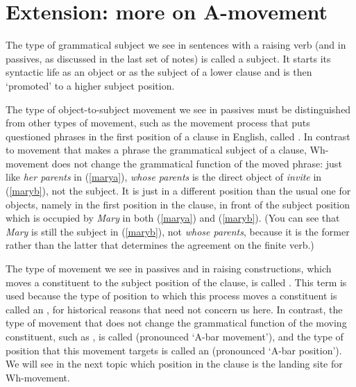 \documentclass{article}
\begin{document}
\section{Extension: more on A-movement}
The type of grammatical subject we see in sentences with a raising verb (and in passives, as discussed in the last set of notes) is called a  subject. It starts its syntactic life as an object or as the subject of a lower clause and is then `promoted' to a higher subject position.

The type of object-to-subject movement we see in passives must be distinguished from other types of movement, such as the movement process that puts questioned phrases in the first position of a clause in English, called .
In contrast to movement that makes a phrase the grammatical subject of a clause, Wh-movement does not change the grammatical function of the moved phrase: just like \emph{her parents} in (\ref{marya}), \emph{whose parents} is the direct object of \emph{invite} in (\ref{maryb}), not the subject.
It is just in a different position than the usual one for objects, namely in the first position in the clause, in front of the subject position which is occupied by \emph{Mary} in both (\ref{marya}) and (\ref{maryb}).
(You can see that \emph{Mary} is still the subject in (\ref{maryb}), not \emph{whose parents}, because it is the former rather than the latter that determines the agreement on the finite verb.)
\begin{exe}
\end{exe}
The type of movement we see in passives and in raising constructions, which moves a constituent to the subject position of the clause, is called .
This term is used because the type of position to which this process moves a constituent is called an , for historical reasons that need not concern us here.
In contrast, the type of movement that does not change the grammatical function of the moving constituent, such as , is called  (pronounced `A-bar movement'), and the type of position that this movement targets is called an  (pronounced `A-bar position').
We will see in the next topic which position in the clause is the landing site for Wh-movement.
\end{document}
